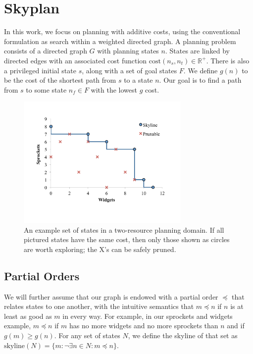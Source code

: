 \documentclass[letterpaper]{article}
\theoremstyle{plain} \newtheorem{theorem}{Theorem} \newtheorem{proposition}{Proposition} \newtheorem{lemma}{Lemma}
\theoremstyle{definition} \newtheorem{definition}{Definition} \newtheorem{conjecture}{Conjecture} \newtheorem*{example}{Example}
\theoremstyle{remark} \newtheorem*{remark}{Remark} \newtheorem*{note}{Note} \newtheorem{case}{Case}
\begin{document}
\section{Skyplan}


In this work, we focus on planning with additive
costs, using the conventional formulation as search within a weighted directed graph.  A planning problem
consists of a directed graph $G$ with planning states $n$. States are linked by directed edges with an associated
cost function $\mathrm{cost}(n_s,n_t) \in \mathbb R^+$.  There is
also a privileged initial state $s$, along with a set of goal states
$F$.  We define $g(n)$ to be the cost of the shortest path from $s$
to a state $n$.  Our goal is to find a path from $s$ to some state
$n_f \in F$ with the lowest $g$ cost.


\begin{figure}
	\begin{center}
	\includegraphics[width=3.3in]{skyline2d.pdf}
  \vspace{-.4in}
\end{center}
  \caption{An example set of states in a two-resource planning domain. If
all pictured states have the same cost, then only those shown as circles are
worth exploring; the X's can be safely pruned.}
  \label{fig:skyline}
  \vspace{-.2in}
\end{figure}


\subsection{Partial Orders}

We will further assume that our graph is endowed with a partial
order $\preceq$ that relates states to one another, with the
intuitive semantics that $m \preceq n$ if $n$ is at least as good as $m$
in every way. For example, in our sprockets and widgets example, $m
\preceq n$ if $m$ has no more widgets and no more sprockets than
$n$ and if $g(m) \ge g(n)$. For any
set of states $N$, we define the skyline of that set as
$\textrm{skyline}(N)=\{m: \neg\exists n \in N: m \preceq n\}$. 
\end{document}
